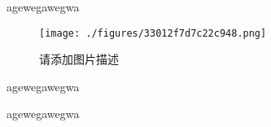 

agewegawegwa
\begin{figure}[ht]
\centering
\texttt{[image: ./figures/33012f7d7c22c948.png]}
\caption{请添加图片描述} \label{fig_testIM_2}
\end{figure}

agewegawegwa

agewegawegwa

